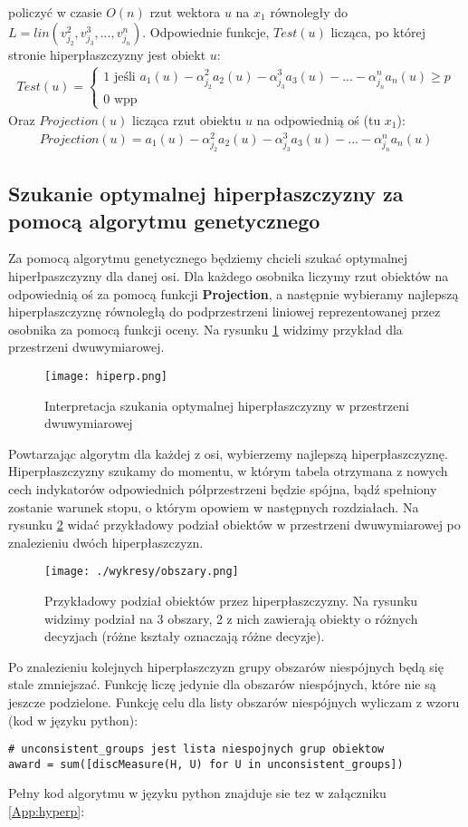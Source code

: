 \documentclass[magisterska]{pracamgr}
\theoremstyle{plain}
\theoremstyle{definition}
\theoremstyle{remark}
\begin{document}
policzyć w czasie $O(n)$ rzut wektora $u$ na $x_1$ równoległy do $L = lin(v_{j_2}^2, v_{j_3}^3, ..., v_{j_n}^n)$. Odpowiednie funkcje, $Test(u)$
licząca, po której stronie hiperpłaszczyzny jest obiekt $u$:
\begin{align*}
 Test(u) = \begin{cases} 1 \text{ jeśli } a_1(u) - \alpha_{j_2}^2 a_2(u) - \alpha_{j_3}^3 a_3(u) - 
 ... - \alpha_{j_n}^n a_n(u) \geq p \\ 0 \text{ wpp } \end{cases}
\end{align*}
Oraz $Projection(u)$ licząca rzut obiektu $u$ na odpowiednią oś (tu $x_1$):
\begin{align*}
 Projection(u) = a_1(u) - \alpha_{j_2}^2 a_2(u) - \alpha_{j_3}^3 a_3(u) - ... - \alpha_{j_n}^n a_n(u)
\end{align*}
\subsection{Szukanie optymalnej hiperpłaszczyzny za pomocą algorytmu genetycznego}
Za pomocą algorytmu genetycznego będziemy chcieli szukać optymalnej hiperłpaszczyzny dla danej osi. Dla każdego osobnika liczymy rzut obiektów na 
odpowiednią oś za pomocą funkcji \textbf{Projection}, a następnie wybieramy najlepszą hiperpłaszczyznę równoległą do podprzestrzeni liniowej 
reprezentowanej przez osobnika za pomocą funkcji oceny. Na rysunku \ref{fig:hiperp} widzimy przykład dla przestrzeni dwuwymiarowej.
\begin{figure}\label{fig:hiperp}
 \caption{Interpretacja szukania optymalnej hiperpłaszczyzny w przestrzeni dwuwymiarowej}
 \texttt{[image: hiperp.png]}
\end{figure}
Powtarzając algorytm dla każdej z osi,
wybierzemy najlepszą hiperpłaszczyznę. Hiperpłaszczyzny szukamy do momentu, w którym tabela otrzymana z nowych cech indykatorów odpowiednich 
półprzestrzeni będzie spójna, bądź spełniony zostanie warunek stopu, o którym opowiem w następnych rozdziałach. Na rysunku \ref{fig:obszary}
widać przykładowy podział obiektów w przestrzeni dwuwymiarowej po znalezieniu dwóch hiperpłaszczyzn.
\begin{figure}\label{fig:obszary}
 \caption{Przykładowy podział obiektów przez hiperpłaszczyzny. Na rysunku widzimy podział na 3 obszary, 2 z nich zawierają obiekty
 o różnych decyzjach (różne kształy oznaczają różne decyzje).}
 \texttt{[image: ./wykresy/obszary.png]}
\end{figure}
Po znalezieniu kolejnych hiperpłaszczyzn grupy obszarów niespójnych będą się stale zmniejszać. Funkcję liczę jedynie dla obszarów
niespójnych, które nie są jeszcze podzielone. Funkcję celu dla listy obszarów niespójnych wyliczam z wzoru (kod w języku python):
\begin{lstlisting}
# unconsistent_groups jest lista niespojnych grup obiektow
award = sum([discMeasure(H, U) for U in unconsistent_groups])
\end{lstlisting}
Pełny kod algorytmu w języku python znajduje sie tez w załączniku \ref{App:hyperp}:
    
\end{document}
